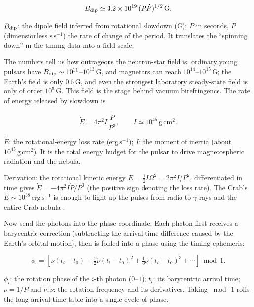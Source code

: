 \begin{equation}
  B_{\rm dip}\simeq 3.2\times10^{19}\,(P\dot P)^{1/2}\,\mathrm{G}.
  \label{eq:e18-bdip}
\end{equation}
\begin{formulaexplain}
\(B_{\rm dip}\): the dipole field inferred from rotational slowdown (\(\mathrm{G}\)); \(P\) in seconds, \(\dot P\) (dimensionless \(\mathrm{s\,s^{-1}}\)) the rate of change of the period. It translates the ``spinning down'' in the timing data into a field scale.
\end{formulaexplain}

The numbers tell us how outrageous the neutron-star field is: ordinary young pulsars have \(B_{\rm dip}\sim10^{11}\)--\(10^{13}\,\mathrm{G}\), and magnetars can reach \(10^{14}\)--\(10^{15}\,\mathrm{G}\); the Earth's field is only \(0.5\,\mathrm{G}\), and even the strongest laboratory steady-state field is only of order \(10^5\,\mathrm{G}\). This field is the stage behind vacuum birefringence. The rate of energy released by slowdown is

\begin{equation}
  \dot E = 4\pi^2 I\,\frac{\dot P}{P^3},
  \qquad
  I\simeq10^{45}\,\mathrm{g\,cm^2}.
  \label{eq:e18-edot}
\end{equation}
\begin{formulaexplain}
\(\dot E\): the rotational-energy loss rate (\(\mathrm{erg\,s^{-1}}\)); \(I\): the moment of inertia (about \(10^{45}\,\mathrm{g\,cm^2}\)). It is the total energy budget for the pulsar to drive magnetospheric radiation and the nebula.
\end{formulaexplain}

Derivation: the rotational kinetic energy \(E=\tfrac12 I\Omega^2=2\pi^2 I/P^2\), differentiated in time gives \(\dot E=-4\pi^2 I\dot P/P^3\) (the positive sign denoting the loss rate). The Crab's \(\dot E\sim10^{38}\,\mathrm{erg\,s^{-1}}\) is enough to light up the pulses from radio to \(\gamma\)-rays and the entire Crab nebula \citep{1984ApJ...283..279H,1992ApJ...397..187B,2001A&A...378..918K,2008ApJ...680.1378H}.

Now send the photons into the phase coordinate. Each photon first receives a barycentric correction (subtracting the arrival-time difference caused by the Earth's orbital motion), then is folded into a phase using the timing ephemeris:

\begin{equation}
  \phi_i=
  \left[
  \nu(t_i-t_0)+\tfrac12\dot\nu(t_i-t_0)^2
  +\tfrac16\ddot\nu(t_i-t_0)^3+\cdots
  \right]\bmod 1 .
  \label{eq:e18-fold}
\end{equation}
\begin{formulaexplain}
\(\phi_i\): the rotation phase of the \(i\)-th photon (\(0\)--\(1\)); \(t_i\): its barycentric arrival time; \(\nu=1/P\) and \(\dot\nu,\ddot\nu\): the rotation frequency and its derivatives. Taking \(\bmod\,1\) rolls the long arrival-time table into a single cycle of phase.
\end{formulaexplain}

